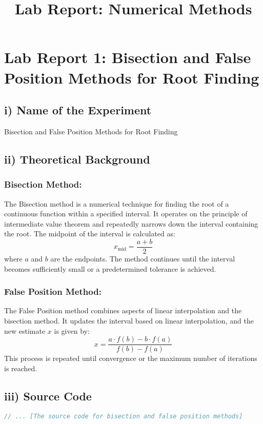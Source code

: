 \documentclass[a4paper,12pt]{article}
\begin{document}
\title{Lab Report: Numerical Methods}
\date{}
\maketitle

\section*{Lab Report 1: Bisection and False Position Methods for Root Finding}

\subsection*{i) Name of the Experiment}
Bisection and False Position Methods for Root Finding

\subsection*{ii) Theoretical Background}
\subsubsection*{Bisection Method:}
The Bisection method is a numerical technique for finding the root of a continuous function within a specified interval. It operates on the principle of intermediate value theorem and repeatedly narrows down the interval containing the root. The midpoint of the interval is calculated as:
\[ x_{\text{mid}} = \frac{a + b}{2} \]
where \(a\) and \(b\) are the endpoints. The method continues until the interval becomes sufficiently small or a predetermined tolerance is achieved.

\subsubsection*{False Position Method:}
The False Position method combines aspects of linear interpolation and the bisection method. It updates the interval based on linear interpolation, and the new estimate \(x\) is given by:
\[ x = \frac{a \cdot f(b) - b \cdot f(a)}{f(b) - f(a)} \]
This process is repeated until convergence or the maximum number of iterations is reached.

\subsection*{iii) Source Code}
\begin{lstlisting}[language=C++]
// ... [The source code for bisection and false position methods]
\end{lstlisting}
\end{document}
